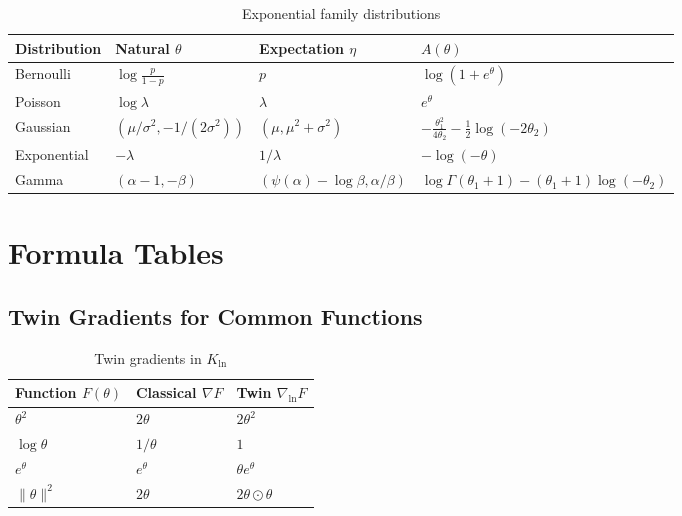 \documentclass[11pt,twoside]{book}
\theoremstyle{plain}
\theoremstyle{definition}
\theoremstyle{remark}
\newcommand{\Kln}{K_{\ln}}
\begin{document}
\begin{table}[htbp]
    \centering
    \caption{Exponential family distributions}
    \begin{tabular}{llll}
        \toprule
        \textbf{Distribution} & \textbf{Natural $\theta$} & \textbf{Expectation $\eta$} & \textbf{$A(\theta)$} \\
        \midrule
        Bernoulli & $\log\frac{p}{1-p}$ & $p$ & $\log(1+e^\theta)$ \\
        Poisson & $\log \lambda$ & $\lambda$ & $e^\theta$ \\
        Gaussian & $(\mu/\sigma^2, -1/(2\sigma^2))$ & $(\mu, \mu^2+\sigma^2)$ & $-\frac{\theta_1^2}{4\theta_2} - \frac{1}{2}\log(-2\theta_2)$ \\
        Exponential & $-\lambda$ & $1/\lambda$ & $-\log(-\theta)$ \\
        Gamma & $(\alpha-1, -\beta)$ & $(\psi(\alpha)-\log\beta, \alpha/\beta)$ & $\log\Gamma(\theta_1+1) - (\theta_1+1)\log(-\theta_2)$ \\
        \bottomrule
    \end{tabular}
\end{table}

\chapter{Formula Tables}
\label{app:formulas}

\section{Twin Gradients for Common Functions}
\label{sec:twin_grad_table}

\begin{table}[htbp]
    \centering
    \caption{Twin gradients in $\Kln$}
    \begin{tabular}{lll}
        \toprule
        \textbf{Function $F(\theta)$} & \textbf{Classical $\nabla F$} & \textbf{Twin $\nabla_{\ln} F$} \\
        \midrule
        $\theta^2$ & $2\theta$ & $2\theta^2$ \\
        $\log \theta$ & $1/\theta$ & $1$ \\
        $e^\theta$ & $e^\theta$ & $\theta e^\theta$ \\
        $\|\theta\|^2$ & $2\theta$ & $2\theta \odot \theta$ \\
        \bottomrule
    \end{tabular}
\end{table}
\end{document}
